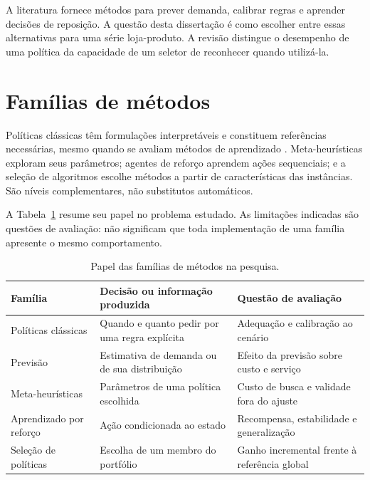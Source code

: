 
A literatura fornece métodos para prever demanda, calibrar regras e aprender decisões de reposição. A questão desta dissertação é como escolher entre essas alternativas para uma série loja-produto. A revisão distingue o desempenho de uma política da capacidade de um seletor de reconhecer quando utilizá-la.

\section{Famílias de métodos}
\label{sec:visao_geral_literatura}

Políticas clássicas têm formulações interpretáveis e constituem referências necessárias, mesmo quando se avaliam métodos de aprendizado \citep{Axsater2006InventoryControl,Zipkin2000FoundationsInventory}. Meta-heurísticas exploram seus parâmetros; agentes de reforço aprendem ações sequenciais; e a seleção de algoritmos escolhe métodos a partir de características das instâncias. São níveis complementares, não substitutos automáticos.

A Tabela~\ref{tab:sintese_metodos_literatura} resume seu papel no problema estudado. As limitações indicadas são questões de avaliação: não significam que toda implementação de uma família apresente o mesmo comportamento.

\begin{table}[htb]
\centering\small
\caption{Papel das famílias de métodos na pesquisa.}
\label{tab:sintese_metodos_literatura}
\begin{tabular}{@{}p{3.0cm}p{5.1cm}p{5.0cm}@{}}
\toprule
Família & Decisão ou informação produzida & Questão de avaliação\\
\midrule
Políticas clássicas & Quando e quanto pedir por uma regra explícita & Adequação e calibração ao cenário\\
Previsão & Estimativa de demanda ou de sua distribuição & Efeito da previsão sobre custo e serviço\\
Meta-heurísticas & Parâmetros de uma política escolhida & Custo de busca e validade fora do ajuste\\
Aprendizado por reforço & Ação condicionada ao estado & Recompensa, estabilidade e generalização\\
Seleção de políticas & Escolha de um membro do portfólio & Ganho incremental frente à referência global\\
\bottomrule
\end{tabular}
\end{table}

